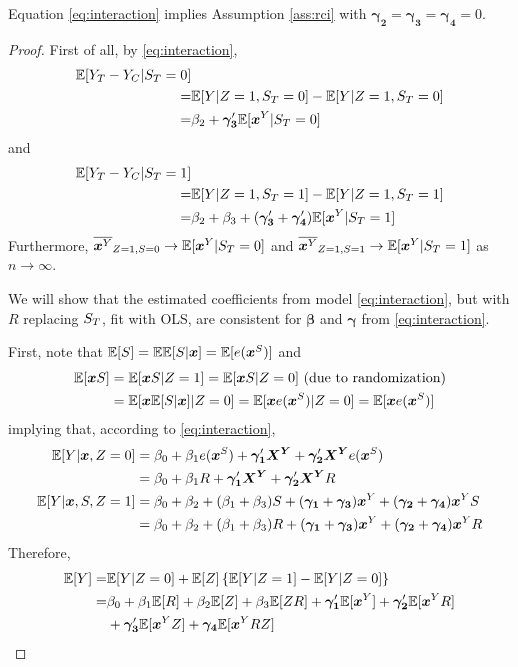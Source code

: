 \documentclass[]{article}
\begin{document}
Equation \eqref{eq:interaction} implies Assumption \ref{ass:rci} with $\bm{\gamma_2}=\bm{\gamma_3}=\bm{\gamma_4}=0$.

\begin{proof}
First of all, by \eqref{eq:interaction},
\begin{equation*}
\begin{split}
  \mathbb{E}[Y_T-Y_C|S_T=0]&\\
  =&\mathbb{E}[Y|Z=1,S_T=0]-\mathbb{E}[Y|Z=1,S_T=0]\\
  =&\beta_2+\bm{\gamma_3}'\mathbb{E}[\bm{x}^Y|S_T=0]
\end{split}
\end{equation*}
and
\begin{equation*}
\begin{split}
  \mathbb{E}[Y_T-Y_C|S_T=1]&\\
  =&\mathbb{E}[Y|Z=1,S_T=1]-\mathbb{E}[Y|Z=1,S_T=1]\\
  =&\beta_2+\beta_3+(\bm{\gamma_3}'+\bm{\gamma_4}')\mathbb{E}[\bm{x}^Y|S_T=1]
\end{split}
\end{equation*}
Furthermore, $\overline{\bm{x}^Y}_{Z=1,S=0}\rightarrow \mathbb{E}[\bm{x}^Y|S_T=0]$ and $\overline{\bm{x}^Y}_{Z=1,S=1}\rightarrow \mathbb{E}[\bm{x}^Y|S_T=1]$ as $n\rightarrow \infty$.

We will show that the estimated coefficients from model \eqref{eq:interaction}, but with $R$ replacing $S_T$, fit with OLS, are consistent for $\bm{\beta}$ and $\bm{\gamma}$ from \eqref{eq:interaction}.

First, note that $\mathbb{E}[S]=\mathbb{E}\mathbb{E}[S|\bm{x}]=\mathbb{E}[e(\bm{x}^S)]$ and
\begin{align*}
  \mathbb{E}[\bm{x} S]&=\mathbb{E}[\bm{x} S|Z=1]=\mathbb{E}[\bm{x} S|Z=0] \mbox{ (due to randomization)}\\
  &=\mathbb{E}[\bm{x}\mathbb{E}[S|\bm{x}]|Z=0]=\mathbb{E}[\bm{x}e(\bm{x}^S)|Z=0]=\mathbb{E}[\bm{x}e(\bm{x}^S)]
\end{align*}
implying that, according to \eqref{eq:interaction},
\begin{equation*}
  \begin{split}
    \mathbb{E}[Y|\bm{x},Z=0]&=\beta_0+\beta_1e(\bm{x}^S)+\bm{\gamma_1}'\bm{X^Y}+\bm{\gamma_2}'\bm{X^Y}e(\bm{x}^S)\\
                  &=\beta_0+\beta_1R+\bm{\gamma_1}'\bm{X^Y}+\bm{\gamma_2}'\bm{X^Y}R\\
    \mathbb{E}[Y|\bm{x},S,Z=1]&=\beta_0+\beta_2+(\beta_1+\beta_3)S+(\bm{\gamma_1}+\bm{\gamma_3})\bm{x}^Y+(\bm{\gamma_2}+\bm{\gamma_4})\bm{x}^Y S\\
    &=\beta_0+\beta_2+(\beta_1+\beta_3)R+(\bm{\gamma_1}+\bm{\gamma_3})\bm{x}^Y+(\bm{\gamma_2}+\bm{\gamma_4})\bm{x}^Y R
  \end{split}
\end{equation*}
Therefore,
\begin{align*}
  \mathbb{E}[Y]=&\mathbb{E}[Y|Z=0]+\mathbb{E}[Z]\left\{\mathbb{E}[Y|Z=1]-\mathbb{E}[Y|Z=0]\right\}\\
  =&\beta_0+\beta_1\mathbb{E}[R]+\beta_2\mathbb{E}[Z]+\beta_3\mathbb{E}[ZR]+\bm{\gamma_1}'\mathbb{E}[\bm{x}^Y]+\bm{\gamma_2}'\mathbb{E}[\bm{x}^Y R]\\
  &+\bm{\gamma_3}'\mathbb{E}[\bm{x}^Y Z]+\bm{\gamma_4}\mathbb{E}[\bm{x}^Y RZ]
\end{align*}


\end{proof}
\end{document}
